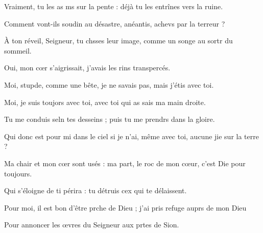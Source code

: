 \item Vraiment, tu les as ms sur la pente :\psstar{} déjà tu les entrînes vers la ruine.
\item Comment vont-ils soudin au désastre,\psstar{} anéantis, achevs par la terreur ?
\item À ton réveil, Seigneur, tu chsses leur image,\psstar{} comme un songe au sortr du sommeil.
\item Oui, mon cœr s’aigrissait,\psstar{} j’avais les rins transpercés.
\item Moi, stupde, comme une bête,\psstar{} je ne savais pas, mais j’étis avec toi.
\item Moi, je suis toujors avec toi,\psstar{} avec toi qui as sais ma main droite.
\item Tu me conduis seln tes desseins ;\psstar{} puis tu me prendrs dans la gloire.
\item Qui donc est pour mi dans le ciel\psstar{} si je n’ai, même avec toi, aucune jie sur la terre ?
\item Ma chair et mon cœr sont usés :\psstar{} ma part, le roc de mon cœur, c’est Die pour toujours.
\item Qui s’éloigne de ti périra :\psstar{} tu détruis cex qui te délaissent.
\item Pour moi, il est bon d’être prche de Dieu ;\psstar{} j’ai pris refuge auprs de mon Dieu
\item Pour annoncer les œvres du Seigneur\psstar{} aux prtes de Sion.